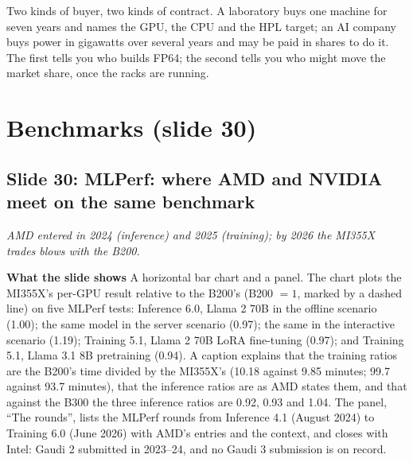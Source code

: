 \documentclass[11pt,letterpaper]{article}
\newcommand{\setstage}[1]{\colorlet{stagec}{#1}}
\newcommand{\slide}[3]{%
  \subsection[Slide #1: #2]{Slide #1: #2}%
  {\color{muted}\itshape #3\par}\medskip}
\newcommand{\para}[1]{\medskip\noindent\textbf{#1}\quad}
\newenvironment{intuition}{\begin{tcolorbox}[intuitionbox]}{\end{tcolorbox}}
\begin{document}
\begin{intuition}
Two kinds of buyer, two kinds of contract. A laboratory buys one machine for seven years and names the GPU, the CPU and the HPL target; an AI company buys power in gigawatts over several years and may be paid in shares to do it. The first tells you who builds FP64; the second tells you who might move the market share, once the racks are running.
\end{intuition}
\setstage{vc}
\section{Benchmarks (slide 30)}

\slide{30}{MLPerf: where AMD and NVIDIA meet on the same benchmark}{AMD entered in 2024 (inference) and 2025 (training); by 2026 the MI355X trades blows with the B200.}

\para{What the slide shows} A horizontal bar chart and a panel. The chart plots the MI355X's per-GPU result relative to the B200's (B200 $= 1$, marked by a dashed line) on five MLPerf tests: Inference 6.0, Llama 2 70B in the offline scenario (1.00); the same model in the server scenario (0.97); the same in the interactive scenario (1.19); Training 5.1, Llama 2 70B LoRA fine-tuning (0.97); and Training 5.1, Llama 3.1 8B pretraining (0.94). A caption explains that the training ratios are the B200's time divided by the MI355X's (10.18 against 9.85 minutes; 99.7 against 93.7 minutes), that the inference ratios are as AMD states them, and that against the B300 the three inference ratios are 0.92, 0.93 and 1.04. The panel, ``The rounds'', lists the MLPerf rounds from Inference 4.1 (August 2024) to Training 6.0 (June 2026) with AMD's entries and the context, and closes with Intel: Gaudi 2 submitted in 2023--24, and no Gaudi 3 submission is on record.
\end{document}
